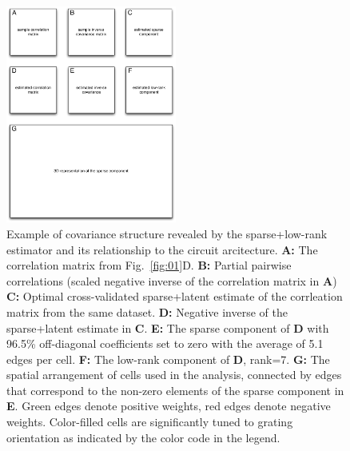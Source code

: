 \begin{figure}[htp]
\centering
\includegraphics[width=0.5\textwidth]{figures/Figure5.pdf}
\caption{
Example of covariance structure revealed by the sparse+low-rank estimator and its relationship to the circuit arcitecture.
{\bf A:} The correlation matrix from Fig.~\ref{fig:01}D. 
{\bf B:} Partial pairwise correlations (scaled negative inverse of the correlation matrix in {\bf A}) 
{\bf C:} Optimal cross-validated sparse+latent estimate of the corrleation matrix from the same dataset. 
{\bf D:} Negative inverse of the sparse+latent estimate in {\bf C}. 
{\bf E:} The sparse component of {\bf D} with 96.5\% off-diagonal coefficients set to zero with the average of 5.1 edges per cell.
{\bf F:} The low-rank component of {\bf D}, rank=7.
{\bf G:} The spatial arrangement of cells used in the analysis, connected by edges that correspond to the non-zero elements of the sparse component in {\bf E}. Green edges denote positive weights, red edges denote negative weights.  Color-filled cells are significantly tuned to grating orientation as indicated by the color code in the legend.
}
\label{fig:05}
\end{figure}
